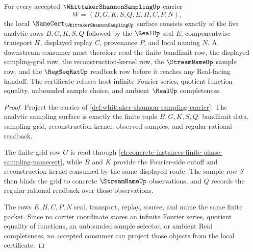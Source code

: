 \begin{theorem}
\label{thm:whittaker-shannon-sampling-namecert-obligations}
For every accepted $\WhittakerShannonSamplingUp$ carrier
$$
W=(B,G,K,S,Q,E,H,C,P,N),
$$
the local $\NameCert_{\WhittakerShannonSamplingUp}$ surface consists exactly of the five analytic rows $B,G,K,S,Q$ followed by the $\RealUp$ seal $E$, componentwise transport $H$, displayed replay $C$, provenance $P$, and local naming $N$. A downstream consumer must therefore read the finite bandlimit row, the displayed sampling-grid row, the reconstruction-kernel row, the $\StreamNameUp$ sample row, and the $\RegSeqRatUp$ readback row before it reaches any Real-facing handoff. The certificate refuses host infinite Fourier series, quotient function equality, unbounded sample choice, and ambient $\RealUp$ completeness.
\end{theorem}
\begin{proof}
Project the carrier of \autoref{def:whittaker-shannon-sampling-carrier}. The analytic sampling surface is exactly the finite tuple $B,G,K,S,Q$: bandlimit data, sampling grid, reconstruction kernel, observed samples, and regular-rational readback.

The finite-grid row $G$ is read through \autoref{ch:concrete-instances-finite-phase-sampling-namecert}, while $B$ and $K$ provide the Fourier-side cutoff and reconstruction kernel consumed by the same displayed route. The sample row $S$ then binds the grid to concrete $\StreamNameUp$ observations, and $Q$ records the regular rational readback over those observations.

The rows $E,H,C,P,N$ seal, transport, replay, source, and name the same finite packet. Since no carrier coordinate stores an infinite Fourier series, quotient equality of functions, an unbounded sample selector, or ambient Real completeness, no accepted consumer can project those objects from the local certificate.
\end{proof}



